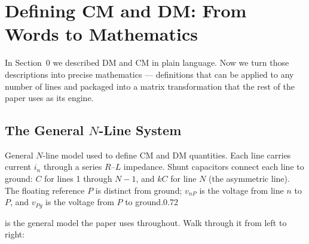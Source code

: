 \section{Defining CM and DM: From Words to Mathematics}

In Section~0 we described DM and CM in plain language.  Now we turn
those descriptions into precise mathematics — definitions that can be
applied to any number of lines and packaged into a matrix
transformation that the rest of the paper uses as its engine.

\subsection{The General \texorpdfstring{$N$}{N}-Line System}

{General $N$-line model used to define CM and DM quantities.
 Each line carries current $i_n$ through a series $R$--$L$ impedance.
 Shunt capacitors connect each line to ground: $C$ for lines 1 through
 $N-1$, and $kC$ for line $N$ (the asymmetric line).
 The floating reference $P$ is distinct from ground;
 $v_{nP}$ is the voltage from line $n$ to $P$,
 and $v_{Pg}$ is the voltage from $P$ to ground.}{0.72}

 is the general model the paper uses throughout.
Walk through it from left to right:


